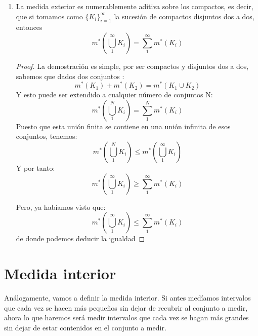 \documentclass{apuntes}
\begin{document}
\begin{enumerate}
\begin{proof}
Si comprobamos que esto se cumple para cualquier $\epsilon$ tendremos la igualdad, puesto que podremos tomar un $\epsilon$ infinitamente pequeño.

Dado $\epsilon > 0 \ \exists O$ abierto tal que $C_1 \cup C_2 \subset O$, entonces, como ya comprobamos, tenemos que:
\[m^*(O) \leq m^*(C_1 \cup C_2) + \epsilon  \ \forall \epsilon\]

Ahora definimos:
\[\rho = \mop{dist}(C_1, C_2)\]
\[O_1 = O \cap \lbrace x \tq \mop{dist}(x, C_1) < \frac{\rho}{2} \rbrace\]
\[O_2 = O \cap \lbrace x \tq \mop{dist}(x, C_2) < \frac{\rho}{2} \rbrace\]
Siendo estos dos conjuntos disjuntos y abiertos.

Como $C_1 \subset O_1$ y $C_2 \subset O_2$ por construcción, tenemos:
\[m^*(C_1) + m^*(C_2) \leq m^*(O_1) + m^*(O_2) \underbrace{=}_{\text{por ser disjuntos}} m^*(O_1 \cup O_2) \leq m^*(O) < m^*(C_1 \cup C_2) + \epsilon \ \forall \epsilon\]
Por tanto
\[m^*(C_1) + m^*(C_2) = m^*(C_1 \cup C_2)\]
\end{proof}


%
\item La medida exterior es numerablemente aditiva sobre los compactos, es decir, que si tomamos como $\lbrace K_i \rbrace_{i=1}^{\infty}$ la sucesión de compactos disjuntos dos a dos, entonces \[ m^*\left(\bigcup_1^{\infty}K_i\right) = \sum_1^{\infty}m^*(K_i) \]

\begin{proof}
La demostración es simple, por ser compactos y disjuntos dos a dos, sabemos que dados dos conjuntos :
\[m^*(K_1) + m^*(K_2) = m^*(K_1 \cup K_2)\]
Y esto puede ser extendido a cualquier número de conjuntos N:
\[m^*(\bigcup_1^{N}K_i) = \sum_1^{N}m^*(K_i)\]
Puesto que esta unión finita se contiene en una unión infinita de esos conjuntos, tenemos:
\[m^*(\bigcup_1^{N}K_i) \leq m^*(\bigcup_1^{\infty}K_i)\]
Y por tanto:
\[m^*(\bigcup_1^{\infty}K_i) \geq \sum_1^{\infty}m^*(K_i)\]

Pero, ya habíamos visto que:
\[m^*(\bigcup_1^{\infty}K_i) \leq \sum_1^{\infty}m^*(K_i)\]
de donde podemos deducir la igualdad
\end{proof}
\end{enumerate}

\section{Medida interior}

Análogamente, vamos a definir la medida interior. Si antes medíamos intervalos que cada vez se hacen más pequeños sin dejar de recubrir al conjunto a medir, ahora lo que haremos será medir intervalos que cada vez se hagan más grandes sin dejar de estar contenidos en el conjunto a medir.
\end{document}
